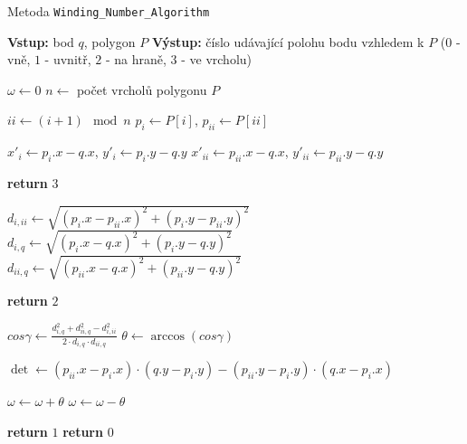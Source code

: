 \begin{algorithm}
    \caption{Metoda \texttt{Winding\_Number\_Algorithm}}
    \begin{algorithmic}[1]
        \STATE \textbf{Vstup:} bod $q$, polygon $P$
        \STATE \textbf{Výstup:} číslo udávající polohu bodu vzhledem k $P$ ($0$ - vně, $1$ - uvnitř, $2$ - na hraně, $3$ - ve vrcholu)
        
        \STATE $\omega \gets 0$ 
        \STATE $n \gets$ počet vrcholů polygonu $P$
        
            \STATE $ii \gets (i + 1) \mod n$
            \STATE $p_i \gets P[i]$, $p_{ii} \gets P[ii]$
            
            \STATE $x'_i \gets p_i.x - q.x$, $y'_i \gets p_i.y - q.y$
            \STATE $x'_{ii} \gets p_{ii}.x - q.x$, $y'_{ii} \gets p_{ii}.y - q.y$
            
                \STATE \textbf{return} $3$ 
            \ENDIF
            
            \STATE $d_{i,ii} \gets \sqrt{(p_i.x - p_{ii}.x)^2 + (p_i.y - p_{ii}.y)^2}$
            \STATE $d_{i,q} \gets \sqrt{(p_i.x - q.x)^2 + (p_i.y - q.y)^2}$
            \STATE $d_{ii,q} \gets \sqrt{(p_{ii}.x - q.x)^2 + (p_{ii}.y - q.y)^2}$
            
                \STATE \textbf{return} $2$ 
            \ENDIF
            
            \STATE $cos\gamma \gets \frac{d_{i,q}^2 + d_{ii,q}^2 - d_{i,ii}^2}{2 \cdot d_{i,q} \cdot d_{ii,q}}$
            \STATE $\theta \gets \arccos(cos\gamma)$
            
            \STATE $\det \gets (p_{ii}.x - p_i.x) \cdot (q.y - p_i.y) - (p_{ii}.y - p_i.y) \cdot (q.x - p_i.x)$
            
                \STATE $\omega \gets \omega + \theta$ 
                \STATE $\omega \gets \omega - \theta$ 
            \ENDIF
        \ENDFOR
        
        \IF{$|\omega| \geq 2\pi - \varepsilon$}
            \STATE \textbf{return} $1$ 
        \ELSE
            \STATE \textbf{return} $0$ 
        \ENDIF
    \end{algorithmic}
\end{algorithm}